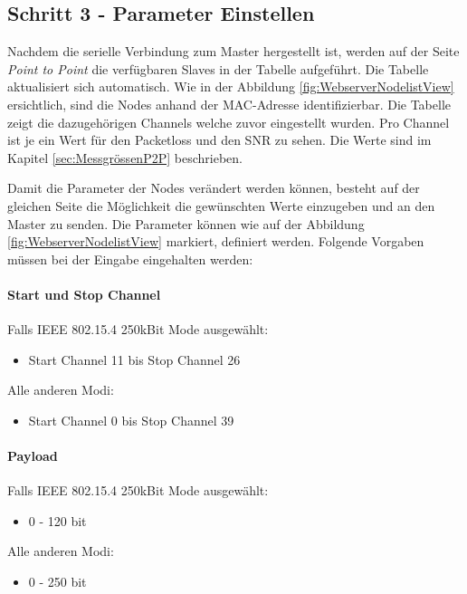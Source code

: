 \subsection{Schritt 3 - Parameter Einstellen}\label{sec:SchrittParameterEinstellen}
Nachdem die serielle Verbindung zum Master hergestellt ist, werden auf der Seite \textit{Point to Point} die verfügbaren Slaves in der Tabelle aufgeführt. Die Tabelle aktualisiert sich automatisch. Wie in der Abbildung \ref{fig:WebserverNodelistView} ersichtlich, sind die Nodes anhand der MAC-Adresse identifizierbar. Die Tabelle zeigt die dazugehörigen Channels welche zuvor eingestellt wurden. Pro Channel ist je ein Wert für den Packetloss und den SNR zu sehen. Die Werte sind im Kapitel \ref{sec:MessgrössenP2P} beschrieben. 

Damit die Parameter der Nodes verändert werden können, besteht auf der gleichen Seite die Möglichkeit die gewünschten Werte einzugeben und an den Master zu senden. Die Parameter können wie auf der Abbildung \ref{fig:WebserverNodelistView} markiert, definiert werden. Folgende Vorgaben müssen bei der Eingabe eingehalten werden:

\paragraph{Start und Stop Channel}
Falls IEEE 802.15.4 250kBit Mode ausgewählt:
\begin{itemize}
	\item Start Channel 11 bis Stop Channel 26
\end{itemize}

Alle anderen Modi:
\begin{itemize}
	\item Start Channel 0 bis Stop Channel 39
\end{itemize}

\paragraph{Payload}
Falls IEEE 802.15.4 250kBit Mode ausgewählt:
\begin{itemize}
	\item 0 - 120 bit
\end{itemize}

Alle anderen Modi:
\begin{itemize}
	\item 0 - 250 bit
\end{itemize}


